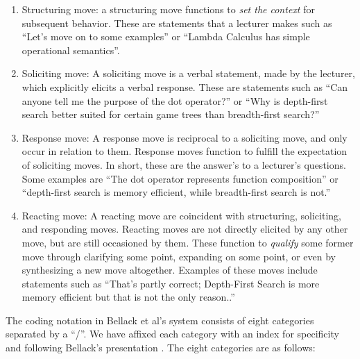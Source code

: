 \documentclass[conference]{IEEEtran}
\begin{document}
\begin{enumerate}[P1.]

  \item \label{contrib:struct}
    Structuring move: a structuring move functions to \emph{set the context} for
    subsequent behavior. These are statements that a lecturer makes such as
    ``Let's move on to some examples'' or ``Lambda Calculus has simple
    operational semantics''.
  
  \item \label{contrib:solicit}
    Soliciting move: A soliciting move is a verbal statement, made by the
    lecturer, which explicitly elicits a verbal response. These are statements
    such as ``Can anyone tell me the purpose of the dot operator?'' or ``Why is
    depth-first search better suited for certain game trees than breadth-first search?''

   \item \label{contrib:response}
     Response move: A response move is reciprocal to a soliciting move, and only
     occur in relation to them. Response moves function to fulfill the
     expectation of soliciting moves. In short, these are the answer's to a
     lecturer's questions. Some examples are ``The dot operator represents
     function composition'' or ``depth-first search is memory efficient, while
     breadth-first search is not.''

   \item \label{contrib:react}
     Reacting move: A reacting move are coincident with structuring, soliciting,
     and responding moves. Reacting moves are not directly elicited by any other
     move, but are still occasioned by them. These function to \emph{qualify}
     some former move through clarifying some point, expanding on some point, or
     even by synthesizing a new move altogether. Examples of these moves include
     statements such as ``That's partly correct; Depth-First Search is more
     memory efficient but that is not the only reason..''

\end{enumerate}

The coding notation in Bellack et al's system consists of eight categories
separated by a ``/''. We have affixed each category with an index for
specificity and following Bellack's presentation . The eight categories are as
follows:
\end{document}
